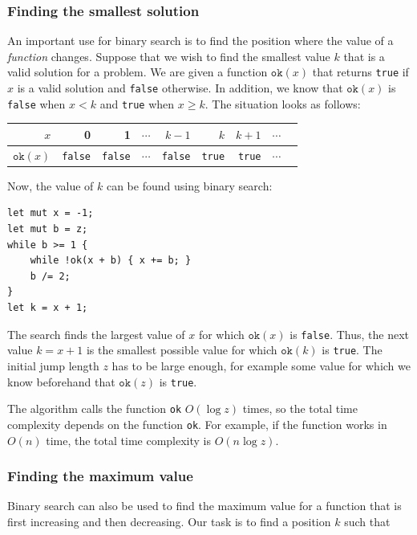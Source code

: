 \subsubsection{Finding the smallest solution}

An important use for binary search is
to find the position where the value of a \emph{function} changes.
Suppose that we wish to find the smallest value $k$
that is a valid solution for a problem.
We are given a function $\texttt{ok}(x)$
that returns \texttt{true} if $x$ is a valid solution
and \texttt{false} otherwise.
In addition, we know that $\texttt{ok}(x)$ is \texttt{false}
when $x<k$ and \texttt{true} when $x \ge k$.
The situation looks as follows:

\begin{center}
\begin{tabular}{r|rrrrrrrr}
$x$ & 0 & 1 & $\cdots$ & $k-1$ & $k$ & $k+1$ & $\cdots$ \\
\hline
$\texttt{ok}(x)$ & \texttt{false} & \texttt{false}
& $\cdots$ & \texttt{false} & \texttt{true} & \texttt{true} & $\cdots$ \\
\end{tabular}
\end{center}

\noindent
Now, the value of $k$ can be found using binary search:

\begin{lstlisting}
let mut x = -1;
let mut b = z;
while b >= 1 {
    while !ok(x + b) { x += b; }
    b /= 2;
}
let k = x + 1;
\end{lstlisting}

The search finds the largest value of $x$ for which
$\texttt{ok}(x)$ is \texttt{false}.
Thus, the next value $k=x+1$
is the smallest possible value for which
$\texttt{ok}(k)$ is \texttt{true}.
The initial jump length $z$ has to be
large enough, for example some value
for which we know beforehand that $\texttt{ok}(z)$ is \texttt{true}.

The algorithm calls the function \texttt{ok}
$O(\log z)$ times, so the total time complexity
depends on the function \texttt{ok}.
For example, if the function works in $O(n)$ time,
the total time complexity is $O(n \log z)$.

\subsubsection{Finding the maximum value}

Binary search can also be used to find
the maximum value for a function that is
first increasing and then decreasing.
Our task is to find a position $k$ such that

